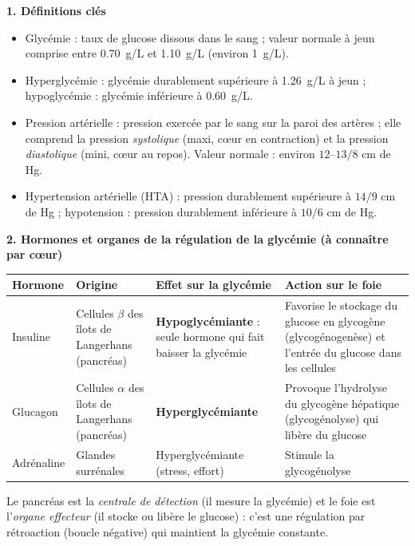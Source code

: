 \documentclass[11pt]{article}
\newcommand{\cle}[1]{{\popxbold\color{popdark}#1}}
\begin{document}
\begin{bilan}
\textbf{1. Définitions clés}
\begin{itemize}
  \item \cle{Glycémie} : taux de glucose dissous dans le sang ; valeur normale à jeun comprise entre \SI{0,70}{g/L} et \SI{1,10}{g/L} (environ \SI{1}{g/L}).
  \item \cle{Hyperglycémie} : glycémie durablement supérieure à \SI{1,26}{g/L} à jeun ; \cle{hypoglycémie} : glycémie inférieure à \SI{0,60}{g/L}.
  \item \cle{Pression artérielle} : pression exercée par le sang sur la paroi des artères ; elle comprend la pression \emph{systolique} (maxi, cœur en contraction) et la pression \emph{diastolique} (mini, cœur au repos). Valeur normale : environ $12$--$13 / 8$ cm de Hg.
  \item \cle{Hypertension artérielle (HTA)} : pression durablement supérieure à $14/9$ cm de Hg ; \cle{hypotension} : pression durablement inférieure à $10/6$ cm de Hg.
\end{itemize}

\textbf{2. Hormones et organes de la régulation de la glycémie (à connaître par cœur)}
\begin{center}
\begin{tabularx}{\linewidth}{|l|X|X|X|}
\hline
\rowcolor{popblueL} \textbf{Hormone} & \textbf{Origine} & \textbf{Effet sur la glycémie} & \textbf{Action sur le foie} \\
\hline
Insuline & Cellules $\beta$ des îlots de Langerhans (pancréas) & \textbf{Hypoglycémiante} : seule hormone qui fait baisser la glycémie & Favorise le stockage du glucose en glycogène (glycogénogenèse) et l'entrée du glucose dans les cellules \\
\hline
Glucagon & Cellules $\alpha$ des îlots de Langerhans (pancréas) & \textbf{Hyperglycémiante} & Provoque l'hydrolyse du glycogène hépatique (glycogénolyse) qui libère du glucose \\
\hline
Adrénaline & Glandes surrénales & Hyperglycémiante (stress, effort) & Stimule la glycogénolyse \\
\hline
\end{tabularx}
\end{center}
Le pancréas est la \emph{centrale de détection} (il mesure la glycémie) et le foie est l'\emph{organe effecteur} (il stocke ou libère le glucose) : c'est une régulation par \cle{rétroaction} (boucle négative) qui maintient la glycémie constante.


\end{bilan}
\end{document}

